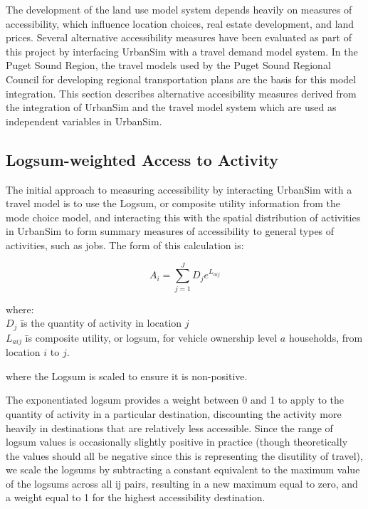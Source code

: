 The development of the land use model system depends heavily on
measures of accessibility, which influence location choices, real
estate development, and land prices.  Several alternative
accessibility measures have been evaluated as part of this project
by interfacing UrbanSim with a travel demand model system.  In the
Puget Sound Region, the travel models used by the Puget Sound
Regional Council for developing regional transportation plans are
the basis for this model integration.  This section describes
alternative accesibility measures derived from the integration of
UrbanSim and the travel model system which are used as independent
variables in UrbanSim.

\subsection{Logsum-weighted Access to Activity}

The initial approach to measuring accessibility by interacting
UrbanSim with a travel model is to use the Logsum, or composite
utility information from the mode choice model, and interacting
this with the spatial distribution of activities in UrbanSim to
form summary measures of accessibility to general types of
activities, such as jobs.   The form of this calculation is:

\begin{equation}
A_i = \sum_{j=1}^{J} D_j e^{L_{aij}} \end{equation}

\begin{tabbing}

where: \= \\
\> $D_j$ \= is the quantity of activity in location $j$ \\

\> $L_{aij}$ \=is composite utility, or logsum, for vehicle
ownership
level $a$ households, from \\
\> \> location $i$ to $j$.

\end{tabbing}

where the Logsum is scaled to ensure it is non-positive.

The exponentiated logsum provides a weight between 0 and 1 to
apply to the quantity of activity in a particular destination,
discounting the activity more heavily in destinations that are
relatively less accessible.  Since the range of logsum values is
occasionally slightly positive in practice (though theoretically
the values should all be negative since this is representing the
disutility of travel), we scale the logsums by subtracting a
constant equivalent to the maximum value of the logsums across all
ij pairs, resulting in a new maximum equal to zero, and a weight
equal to 1 for the highest accessibility destination.

